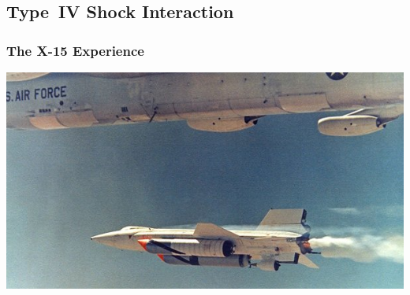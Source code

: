 \documentclass[compress,11pt]{beamer}
\begin{document}
\subsection{Type~IV Shock Interaction}
\frame
{
  \frametitle{\scriptsize The X-15 Experience}
  \vspace{-1.5em}
  \begin{center}
    \includegraphics[width=.71\textwidth]{figures/x15/x15-25} \\


\end{center}}
\end{document}
